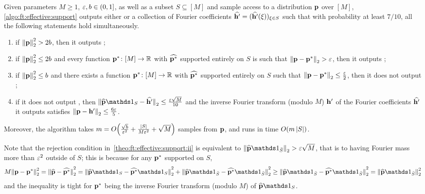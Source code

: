 \begin{theorem}\label{theo:ft:effective:support}
    Given parameters $M\geq 1$, $\varepsilon,b\in(0,1]$, as well as a subset $S\subseteq [M]$ and sample access to a distribution $\mathbf{p}$ over $[M]$, \cref{algo:ft:effective:support} outputs either \reject or a collection of Fourier coefficients $\widehat{\mathbf{h}'}=(\widehat{\mathbf{h}'}(\xi))_{\xi\in S}$ such that with probability at least $7/10$, all the following statements hold simultaneously.
    \begin{enumerate}
        \item\label{theo:ft:effective:support:i} if ${\lVert\mathbf{p}{\rVert}}_2^2 > 2b$, then it outputs \reject;
        \item\label{theo:ft:effective:support:ii} if ${\lVert\mathbf{p}{\rVert}}_2^2 \leq 2b$ and every function $\mathbf{p}^\ast\colon[M]\to\mathbb{R}$ with $\widehat{\mathbf{p}^\ast}$ supported entirely on $S$ is such that ${\lVert\mathbf{p}-\mathbf{p}^\ast{\rVert}}_2 > \varepsilon$, then it outputs \reject;
        \item\label{theo:ft:effective:support:iii} if ${\lVert\mathbf{p}{\rVert}}_2^2 \leq b$ and there exists a function $\mathbf{p}^\ast\colon[M]\to\mathbb{R}$ with $\widehat{\mathbf{p}^\ast}$ supported entirely on $S$ such that ${\lVert\mathbf{p}-\mathbf{p}^\ast{\rVert}}_2 \leq \frac{\varepsilon}{2}$, then it does not output \reject;
        \item\label{theo:ft:effective:support:iv} if it does not output \reject, then $\normtwo{\fourier{\q}\indicSet{S}-\fourier{\h'}} \leq \frac{\eps\sqrt{M}}{10}$ and the inverse Fourier transform (modulo $M$) $\mathbf{h}'$ of the Fourier coefficients $\widehat{\mathbf{h}'}$ it outputs satisfies ${\lVert\mathbf{p}-\mathbf{h}'{\rVert}}_2 \leq \frac{6\varepsilon}{5}$.
    \end{enumerate}
    Moreover, the algorithm takes $m=\bigO{\frac{\sqrt{b}}{\eps^2}+ \frac{\abs{S}}{M\eps^2} +\sqrt{M}}$ samples from $\mathbf{p}$, and runs in time $\bigO{m\abs{S}}$.
\end{theorem}
Note that the rejection condition in~\cref{theo:ft:effective:support:ii} is equivalent to $\normtwo{\fourier{\q}\indicSet{\bar{S}}} > \eps\sqrt{M}$, that is to having Fourier mass more than $\varepsilon^2$ outside of $S$; this is because for any $\mathbf{p}^\ast$ supported on $S$,
\[
    M\normtwo{\q-\q^\ast}^2 = \normtwo{\fourier{\q}-\fourier{\q^\ast}}^2
    = \normtwo{\fourier{\q}\indicSet{S}-\fourier{\q^\ast}\indicSet{S}}^2 + \normtwo{\fourier{\q}\indicSet{\bar{S}}-\fourier{\q^\ast}\indicSet{\bar{S}}}^2
    \geq \normtwo{\fourier{\q}\indicSet{\bar{S}}-\fourier{\q^\ast}\indicSet{\bar{S}}}^2
    = \normtwo{\fourier{\q}\indicSet{\bar{S}}}^2
\]
and the inequality is tight for $\mathbf{p}^\ast$ being the inverse Fourier transform (modulo $M$) of $\fourier{\q}\indicSet{S}$.

